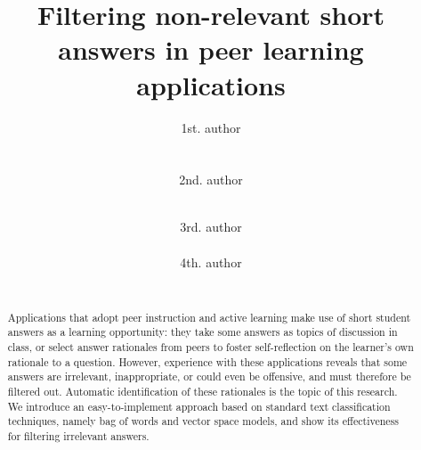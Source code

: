 \documentclass{edm_template}
\begin{document}


\isbn{}


\newcommand{\Mem}[1]{\hl{[#1]}}
\newcommand{\Mmathsym}[1]{\mathrm{#1}}

\title{Filtering non-relevant short answers in peer learning applications}


\newcommand{\ignore}[1]{}
\ignore{
\alignauthor
Vincent Gagnon\\
    \affaddr{Polytechnique Montr\'{e}al}\\~\\
\alignauthor
Audrey Labrie\\
    \affaddr{Polytechnique Montr\'{e}al}\\
\and
\alignauthor
Sameer Bhatnagar\\
    \affaddr{Polytechnique Montr\'{e}al}\\
\alignauthor
Michel C. Desmarais\\
    \affaddr{Polytechnique Montr\'{e}al}\\
}
\author{
\alignauthor
1st. author\\
    \\~\\
\alignauthor
2nd. author\\
    \\
\and
\alignauthor
3rd. author\\
    \\
\alignauthor
4th. author\\
    \\
}

\maketitle


\begin{abstract}
Applications that adopt peer instruction and active learning make use of short student answers as a learning opportunity: they take some answers as topics of discussion in class, or select answer rationales from peers to foster self-reflection on the learner's own rationale to a question.  However, experience with these applications reveals that some answers are irrelevant, inappropriate, or could even be offensive, and must therefore be filtered out.  Automatic identification of these rationales is the topic of this research.  We introduce an easy-to-implement approach based on standard text classification techniques, namely bag of words and vector space models, and show its effectiveness for filtering irrelevant answers.
\end{abstract}
\end{document}
